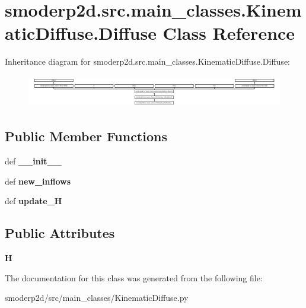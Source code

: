 \hypertarget{classsmoderp2d_1_1src_1_1main__classes_1_1KinematicDiffuse_1_1Diffuse}{\section{smoderp2d.\-src.\-main\-\_\-classes.\-Kinematic\-Diffuse.\-Diffuse Class Reference}
\label{classsmoderp2d_1_1src_1_1main__classes_1_1KinematicDiffuse_1_1Diffuse}
}
Inheritance diagram for smoderp2d.\-src.\-main\-\_\-classes.\-Kinematic\-Diffuse.\-Diffuse\-:\begin{figure}[H]
\begin{center}
\leavevmode
\includegraphics[height=1.414141cm]{classsmoderp2d_1_1src_1_1main__classes_1_1KinematicDiffuse_1_1Diffuse}
\end{center}
\end{figure}
\subsection*{Public Member Functions}
\begin{DoxyCompactItemize}
\item 
\hypertarget{classsmoderp2d_1_1src_1_1main__classes_1_1KinematicDiffuse_1_1Diffuse_a037b417e061247ef505ca1416f65006c}{def {\bfseries \-\_\-\-\_\-init\-\_\-\-\_\-}}\label{classsmoderp2d_1_1src_1_1main__classes_1_1KinematicDiffuse_1_1Diffuse_a037b417e061247ef505ca1416f65006c}

\item 
\hypertarget{classsmoderp2d_1_1src_1_1main__classes_1_1KinematicDiffuse_1_1Diffuse_a927915b728f8e553dfd8d62733e27bf5}{def {\bfseries new\-\_\-inflows}}\label{classsmoderp2d_1_1src_1_1main__classes_1_1KinematicDiffuse_1_1Diffuse_a927915b728f8e553dfd8d62733e27bf5}

\item 
\hypertarget{classsmoderp2d_1_1src_1_1main__classes_1_1KinematicDiffuse_1_1Diffuse_a7e70d7ef597897be0d0acdfe3390ce1b}{def {\bfseries update\-\_\-\-H}}\label{classsmoderp2d_1_1src_1_1main__classes_1_1KinematicDiffuse_1_1Diffuse_a7e70d7ef597897be0d0acdfe3390ce1b}

\end{DoxyCompactItemize}
\subsection*{Public Attributes}
\begin{DoxyCompactItemize}
\item 
\hypertarget{classsmoderp2d_1_1src_1_1main__classes_1_1KinematicDiffuse_1_1Diffuse_a35cd9807eadd4db62eeafe7c657475a9}{{\bfseries H}}\label{classsmoderp2d_1_1src_1_1main__classes_1_1KinematicDiffuse_1_1Diffuse_a35cd9807eadd4db62eeafe7c657475a9}

\end{DoxyCompactItemize}


The documentation for this class was generated from the following file\-:\begin{DoxyCompactItemize}
\item 
smoderp2d/src/main\-\_\-classes/Kinematic\-Diffuse.\-py\end{DoxyCompactItemize}
